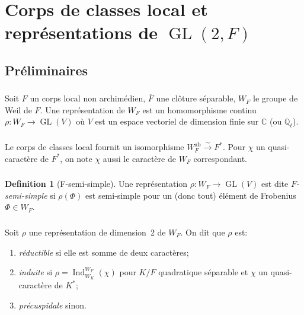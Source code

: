 \documentclass[11pt,a4paper]{amsart}
\theoremstyle{plain}
\theoremstyle{definition}
\newtheorem{definition}[theorem]{Definition}
\theoremstyle{remark}
\DeclareMathOperator{\GL}{GL}
\DeclareMathOperator{\Ind}{Ind}
\DeclareMathOperator{\ab}{ab}
\newcommand{\CC}{\mathbb{C}}
\newcommand{\Ql}{\mathbb{Q}_\ell}
\begin{document}
\section{Corps de classes local et repr\'esentations de $\GL(2,F)$}

\subsection{Pr\'eliminaires}

\subsubsection{}
\label{sec:3.1.1}

Soit $F$ un corps local non archim\'edien, $\overline{F}$ une cl\^oture s\'eparable, $W_F$ le groupe de Weil de $F$. Une repr\'esentation de $W_F$ est un homomorphisme continu $\rho: W_F \to \GL(V)$ o\`u $V$ est un espace vectoriel de dimension finie sur $\CC$ (ou $\Ql$).

\subsubsection{}
\label{sec:3.1.2}

Le corps de classes local fournit un isomorphisme $W_F^{\ab} \xrightarrow{\sim} F^*$. Pour $\chi$ un quasi-caract\`ere de $F^*$, on note $\chi$ aussi le caract\`ere de $W_F$ correspondant.

\subsubsection{}
\label{sec:3.1.3}

\begin{definition}[F-semi-simple] \label{def:f-semi-simple}
Une repr\'esentation $\rho: W_F \to \GL(V)$ est dite \emph{$F$-semi-simple} si $\rho(\Phi)$ est semi-simple pour un (donc tout) \'el\'ement de Frobenius $\Phi \in W_F$.
\end{definition}

\subsubsection{}
\label{sec:3.1.4}

Soit $\rho$ une repr\'esentation de dimension~2 de $W_F$. On dit que $\rho$ est:
\begin{enumerate}
\item[(i)] \emph{r\'eductible} si elle est somme de deux caract\`eres;
\item[(ii)] \emph{induite} si $\rho = \Ind_{W_K}^{W_F}(\chi)$ pour $K/F$ quadratique s\'eparable et $\chi$ un quasi-caract\`ere de $K^*$;
\item[(iii)] \emph{pr\'ecuspidale} sinon.
\end{enumerate}
\end{document}
